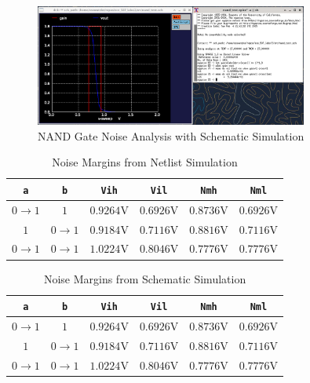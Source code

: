 \documentclass{article}
\begin{document}
	\begin{figure}[H]
		\centerline{\includegraphics[width=0.8\textwidth]{nand_noise_analysis_schem.png}}
		\caption{NAND Gate Noise Analysis with Schematic Simulation}
		\label{fig::nand_noise_analysis_schem}
	\end{figure}
	
	\begin{table}[H]
	\begin{center}
	\caption{Noise Margins from Netlist Simulation}
	\label{table::nand_gate_noise_analysis}
	\begin{tabular}{| c | c | c | c | c | c |}
		\hline
		\texttt{a} & \texttt{b} & \texttt{Vih} & \texttt{Vil} & \texttt{Nmh} & \texttt{Nml} \\
		\hline	
		$0 \rightarrow 1$ & $1$ & $0.9264 \text{V}$ & $0.6926 \text{V}$ & $0.8736 \text{V}$ & $0.6926 \text{V}$\\
		\hline	
		$1$ & $0 \rightarrow 1$ & $0.9184 \text{V}$ & $0.7116 \text{V}$ & $0.8816 \text{V}$ & $0.7116 \text{V}$\\
		\hline	
		$0 \rightarrow 1$ & $0 \rightarrow 1$ & $1.0224 \text{V}$ & $0.8046 \text{V}$ & $0.7776 \text{V}$ & $0.7776 \text{V}$\\
		\hline
	\end{tabular}
	\end{center}
	\end{table}
	
	\begin{table}[H]
	\begin{center}
	\caption{Noise Margins from Schematic Simulation}
	\label{table::nand_gate_noise_analysis}
	\begin{tabular}{| c | c | c | c | c | c |}
		\hline
		\texttt{a} & \texttt{b} & \texttt{Vih} & \texttt{Vil} & \texttt{Nmh} & \texttt{Nml} \\
		\hline	
		$0 \rightarrow 1$ & $1$ & $0.9264 \text{V}$ & $0.6926 \text{V}$ & $0.8736 \text{V}$ & $0.6926 \text{V}$\\
		\hline	
		$1$ & $0 \rightarrow 1$ & $0.9184 \text{V}$ & $0.7116 \text{V}$ & $0.8816 \text{V}$ & $0.7116 \text{V}$\\
		\hline	
		$0 \rightarrow 1$ & $0 \rightarrow 1$ & $1.0224 \text{V}$ & $0.8046 \text{V}$ & $0.7776 \text{V}$ & $0.7776 \text{V}$\\
		\hline
	\end{tabular}
	\end{center}
	\end{table}
	
\end{document}
